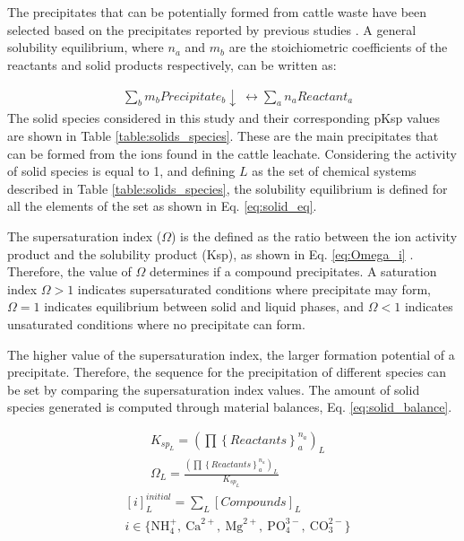 \begin{refsection}[referencesCh3]
The precipitates that can be potentially formed from cattle waste have been selected based on the precipitates reported by previous studies \citep{Tao, Harada, gadekar2010validation}. A general solubility equilibrium, where $n_{a}$ and $m_{b}$ are the stoichiometric coefficients of the reactants and solid products respectively, can be written as:

\begin{align}
& \sum_{b} m_{b} Precipitate_{b}\downarrow  \ \leftrightarrow \sum_{a} n_{a} Reactant_{a}
\end{align}
The solid species considered in this study and their corresponding pKsp values are shown in Table \ref{table:solids_species}. These are the main precipitates that can be formed from the ions found in the cattle leachate. Considering the activity of solid species is equal to 1, and defining $L$ as the set of chemical systems described in Table \ref{table:solids_species}, the solubility equilibrium is defined for all the elements of the set as shown in Eq. \ref{eq:solid_eq}.

The supersaturation index ($\Omega$) is the defined as the ratio between the ion activity product and the solubility product (Ksp), as shown in Eq. \ref{eq:Omega_i} \citep{Tao}. Therefore, the value of $\Omega$ determines if a compound precipitates. A saturation index $\Omega > 1$ indicates supersaturated conditions where precipitate may form, $\Omega =1 $ indicates equilibrium between solid and liquid phases, and $\Omega < 1$ indicates unsaturated conditions where no precipitate can form. 

The higher value of the supersaturation index, the larger formation potential of a precipitate. Therefore, the sequence for the precipitation of different species can be set by comparing the supersaturation index values. The amount of solid species generated is computed through material balances, Eq. \ref{eq:solid_balance}.

\begin{align} 
& K_{sp_{L}}   = \left( \prod \left\{ Reactants \right\}_{a}^{n_{a}} \right)_{L} \label{eq:solid_eq}\\
& \Omega_{L}= \frac{ \left( \prod \left\{ Reactants \right\}_{a}^{n_{a}} \right)_{L} }{ K_{sp_{L}}  } \label{eq:Omega_i}
\end{align}
\begin{align}
& \left[ i \right]_{L}^{initial} =  \sum_{L} \left[Compounds\right]_{L} \label{eq:solid_balance} \\
& i \in \bigl\{\text{NH}_{4}^{+}, \ \text{Ca}^{2+}, \ \text{Mg}^{2+}, \ \text{PO}_{4}^{3-}, \ \text{CO}_{3}^{2-} \bigr\} \nonumber 
\end{align}


\end{refsection}

